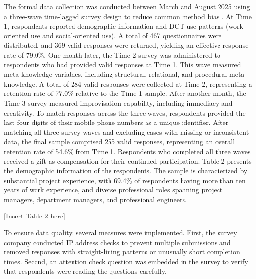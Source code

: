 \documentclass[authoryear,preprint,review,times,10pt]{elsarticle}
\begin{document}
The formal data collection was conducted between March and August 2025 using a three-wave time-lagged survey design to reduce common method bias \citep{podsakoff2003Common}. At Time 1, respondents reported demographic information and DCT use patterns (work-oriented use and social-oriented use). A total of 467 questionnaires were distributed, and 369 valid responses were returned, yielding an effective response rate of 79.0\%. One month later, the Time 2 survey was administered to respondents who had provided valid responses at Time 1. This wave measured meta-knowledge variables, including structural, relational, and procedural meta-knowledge. A total of 284 valid responses were collected at Time 2, representing a retention rate of 77.0\% relative to the Time 1 sample. After another month, the Time 3 survey measured improvisation capability, including immediacy and creativity. To match responses across the three waves, respondents provided the last four digits of their mobile phone numbers as a unique identifier. After matching all three survey waves and excluding cases with missing or inconsistent data, the final sample comprised 255 valid responses, representing an overall retention rate of 54.6\% from Time 1. Respondents who completed all three waves received a gift as compensation for their continued participation. Table 2 presents the demographic information of the respondents. The sample is characterized by substantial project experience, with 69.4\% of respondents having more than ten years of work experience, and diverse professional roles spanning project managers, department managers, and professional engineers. 

\begin{center}[Insert Table 2 here]\end{center}

To ensure data quality, several measures were implemented. First, the survey company conducted IP address checks to prevent multiple submissions and removed responses with straight-lining patterns or unusually short completion times. Second, an attention check question was embedded in the survey to verify that respondents were reading the questions carefully. 
\end{document}
